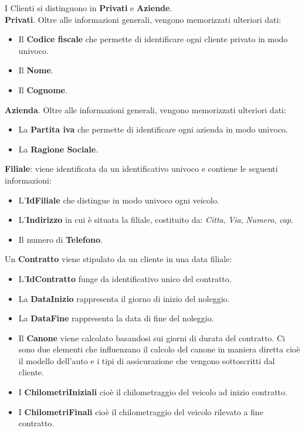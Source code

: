 \documentclass[10pt,a4paper]{article}
\begin{document}
\noindent
I Clienti si distinguono in \textbf{Privati} e \textbf{Aziende}.\\
\textbf{Privati}. Oltre alle informazioni generali, vengono memorizzati ulteriori dati:
\begin{itemize}
    \item Il \textbf{Codice fiscale} che permette di identificare ogni cliente privato in modo univoco.
    \item Il \textbf{Nome}.
    \item Il \textbf{Cognome}.
\end{itemize}
\textbf{Azienda}. Oltre alle informazioni generali, vengono memorizzati ulteriori dati:
\begin{itemize}
    \item La \textbf{Partita iva} che permette di identificare ogni azienda in modo univoco.
    \item La \textbf{Ragione Sociale}.
\end{itemize}
\noindent
\textbf{Filiale}: viene identificata da un identificativo univoco e contiene le seguenti informazioni: 
\begin{itemize}
    \item L'\textbf{IdFiliale} che distingue in modo univoco ogni veicolo.
    \item L'\textbf{Indirizzo} in cui è situata la filiale, costituito da: \textit{Citta}, \textit{Via}, \textit{Numero}, \textit{cap}.
    \item  Il numero di \textbf{Telefono}.    
\end{itemize}
\noindent
Un \textbf{Contratto} viene stipulato da un cliente in una data filiale: 
\begin{itemize}
    \item L'\textbf{IdContratto} funge da identificativo unico del contratto.
    \item La \textbf{DataInizio} rappresenta il giorno di inizio del noleggio.
    \item La \textbf{DataFine} rappresenta la data di fine del noleggio.
    \item Il \textbf{Canone} viene calcolato basandosi sui giorni di durata del contratto. Ci sono due elementi che influenzano il calcolo del canone in maniera diretta cioè il modello dell'auto e i tipi di assicurazione che vengono sottoscritti dal cliente.
    \item I \textbf{ChilometriIniziali} cioè il chilometraggio del veicolo ad inizio contratto.
    \item I \textbf{ChilometriFinali} cioè il chilometraggio del veicolo rilevato a fine contratto.
\end{itemize}
\end{document}
